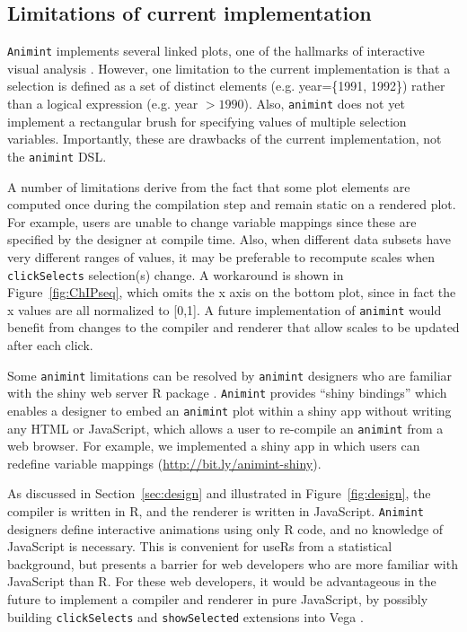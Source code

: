 \documentclass[12pt]{article}\usepackage[]{graphicx}\usepackage[]{color}
\begin{document}
\subsection{Limitations of current implementation}

\texttt{Animint} implements several linked plots, one of the hallmarks of
interactive visual analysis \citep{iva}. However, one limitation to
the current implementation is that a selection is defined as a set of
distinct elements (e.g. year=\{1991, 1992\}) rather than a logical
expression (e.g. year $>1990$). Also, \texttt{animint} does not yet
implement a rectangular brush for specifying values of
multiple selection variables.
Importantly, these are drawbacks of the
current implementation, not the \texttt{animint} DSL.

A number of limitations derive from the fact that some plot elements
are computed once during the compilation step and remain static on a
rendered plot. For example, users are unable to change variable
mappings since these are specified by the designer at compile
time. Also, when different data subsets have very different ranges of
values, it may be preferable to recompute scales when
\texttt{clickSelects} selection(s) change. A workaround is shown in
Figure~\ref{fig:ChIPseq}, which omits the x axis on the bottom plot,
since in fact the x values are all normalized to [0,1]. A future
implementation of \texttt{animint} would benefit from changes to the compiler
and renderer that allow scales to be updated after each click.

Some \texttt{animint} limitations can be resolved by \texttt{animint} designers who are
familiar with the shiny web server R package \citep{shiny}.  \texttt{Animint}
provides ``shiny bindings'' which enables a designer to embed an
\texttt{animint} plot within a shiny app without writing any HTML or
JavaScript, which allows a user to re-compile an \texttt{animint} from a web
browser. For example, we implemented a shiny app in which users can
redefine variable mappings (\url{http://bit.ly/animint-shiny}).

As discussed in Section~\ref{sec:design} and illustrated in
Figure~\ref{fig:design}, the compiler is written in R, and the
renderer is written in JavaScript.
\texttt{Animint} designers define interactive animations using only R code, and
no knowledge of JavaScript is necessary. This is convenient for useRs
from a statistical background, but presents a barrier for web
developers who are more familiar with JavaScript than R. For these web
developers, it would be advantageous in the future to implement a
compiler and renderer in pure JavaScript, by possibly building
\texttt{clickSelects} and \texttt{showSelected} extensions into Vega
\citep{vega}.
\end{document}
